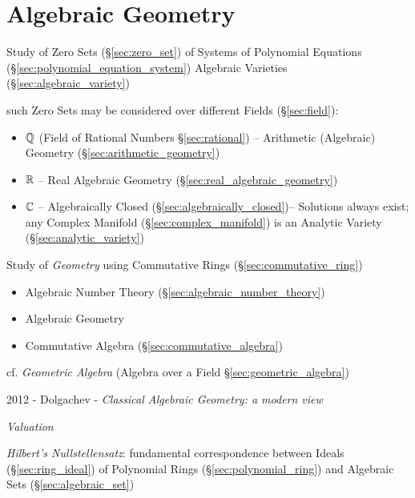 \part{Algebraic Geometry}\label{part:algebraic_geometry}

Study of Zero Sets (\S\ref{sec:zero_set}) of Systems of Polynomial Equations
(\S\ref{sec:polynomial_equation_system}) \fist Algebraic Varieties
(\S\ref{sec:algebraic_variety})

such Zero Sets may be considered over different Fields (\S\ref{sec:field}):
\begin{itemize}
  \item $\mathbb{Q}$ (Field of Rational Numbers \S\ref{sec:rational}) --
    Arithmetic (Algebraic) Geometry (\S\ref{sec:arithmetic_geometry})
  \item $\mathbb{R}$ -- Real Algebraic Geometry
    (\S\ref{sec:real_algebraic_geometry})
  \item $\mathbb{C}$ -- Algebraically Closed (\S\ref{sec:algebraically_closed})--
    Solutions always exist; any Complex Manifold (\S\ref{sec:complex_manifold})
    is an Analytic Variety (\S\ref{sec:analytic_variety})
\end{itemize}

Study of \emph{Geometry} using Commutative Rings (\S\ref{sec:commutative_ring})

\begin{itemize}
  \item Algebraic Number Theory (\S\ref{sec:algebraic_number_theory})
  \item Algebraic Geometry
  \item Commutative Algebra (\S\ref{sec:commutative_algebra})
\end{itemize}

cf. \emph{Geometric Algebra} (Algebra over a Field
\S\ref{sec:geometric_algebra})

2012 - Dolgachev - \emph{Classical Algebraic Geometry: a modern view}

\emph{Valuation}

\emph{Hilbert's Nullstellensatz}: fundamental correspondence between Ideals
(\S\ref{sec:ring_ideal}) of Polynomial Rings (\S\ref{sec:polynomial_ring}) and
Algebraic Sets (\S\ref{sec:algebraic_set})


